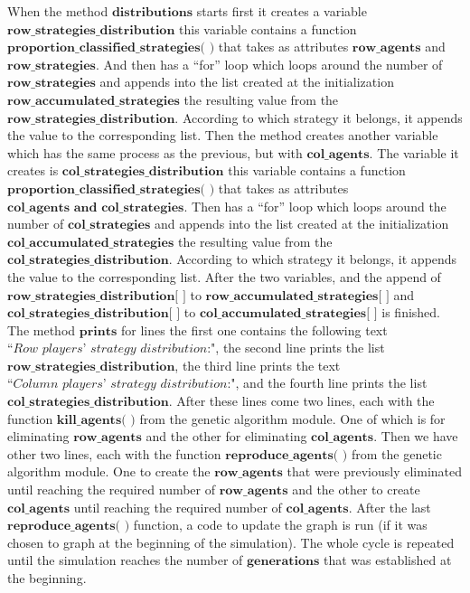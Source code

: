 \documentclass{book}
\begin{document}
When the method $\textbf{distributions}$ starts first it creates a variable $\textbf{row\_strategies\_distribution}$ this variable contains a function $\textbf{proportion\_classified\_strategies( )}$ that takes as attributes $\textbf{row\_agents}$ and $\textbf{row\_strategies}$. And then has a ``for'' loop which loops around the number of  $\textbf{row\_strategies}$ and appends into the list created at the initialization $\textbf{row\_accumulated\_strategies}$ the resulting value from the $\textbf{row\_strategies\_distribution}$. According to which strategy it belongs, it appends the value to the corresponding list. 
Then the method creates another variable which has the same process as the previous, but with $\textbf{col\_agents}$. The variable it creates is $\textbf{col\_strategies\_distribution}$ this variable contains a function $\textbf{proportion\_classified\_strategies( )}$ that takes as attributes $\textbf{col\_agents and col\_strategies}$. Then has a ``for'' loop which loops around the number of  $\textbf{col\_strategies}$ and appends into the list created at the initialization $\textbf{col\_accumulated\_strategies}$ the resulting value from the $\textbf{col\_strategies\_distribution}$. According to which strategy it belongs, it appends the value to the corresponding list.
After the two variables, and the append of $\textbf{row\_strategies\_distribution[  ]}$ to $\textbf{row\_accumulated\_strategies[  ]}$ and $\textbf{col\_strategies\_distribution[  ]}$ to $\textbf{col\_accumulated\_strategies[  ]}$ is finished. The method $\textbf{prints}$ for lines the first one contains the following text $\textit{``Row players' strategy distribution:"}$, the second line prints the list $\textbf{row\_strategies\_distribution}$, the third line prints the text $\textit{``Column players' strategy distribution:"}$, and the fourth line prints the list $\textbf{col\_strategies\_distribution}$. 
After these lines come two lines, each with the function $\textbf{kill\_agents( )}$ from the genetic algorithm module. One of which is for eliminating $\textbf{row\_agents}$ and the other for eliminating $\textbf{col\_agents}$.  
Then we have other two lines, each with the function $\textbf{reproduce\_agents( )}$ from the genetic algorithm module. One to create the $\textbf{row\_agents}$ that were previously eliminated until reaching the required number of $\textbf{row\_agents}$ and the other to create $\textbf{col\_agents}$ until reaching the required number of $\textbf{col\_agents}$. 
After the last $\textbf{reproduce\_agents( )}$ function, a code to update the graph is run (if it was chosen to graph at the beginning of the simulation). 
The whole cycle is repeated until the simulation reaches the number of $\textbf{generations}$ that was established at the beginning. 
\end{document}
